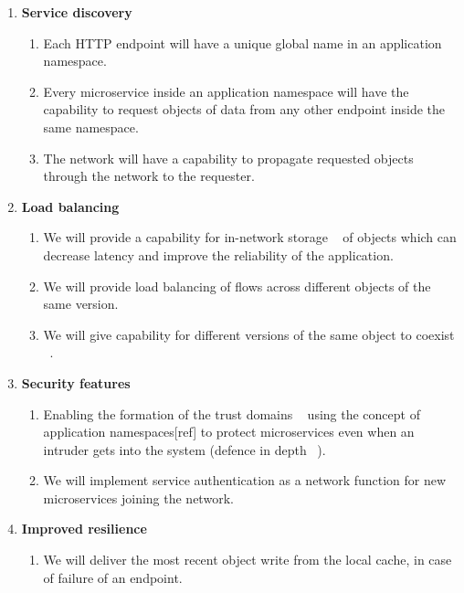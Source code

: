  \begin{enumerate}
 	\item \textbf{Service discovery}
 	 \begin{enumerate}
      	\item Each HTTP endpoint will have a unique global name in an application namespace.
    		\item Every microservice inside an application namespace will have the capability to request objects of data from any other endpoint inside the same namespace.
    		\item The network will have a capability to propagate requested objects through the network to the requester.
	 \end{enumerate}
 
 \item \textbf{Load balancing}
   \begin{enumerate}
    \item We will provide a capability for in-network storage ~\cite{zhang2014named} of objects which can decrease latency and improve the reliability of the application.
    \item We will provide load balancing of flows across different objects of the same version.
    \item We will give capability for different versions of the same object to coexist ~\cite{newman2015building}. 
   \end{enumerate}
   
 \item \textbf{Security features}
  \begin{enumerate}
    \item Enabling the formation of the trust domains ~\cite{dragoni2016microservices} using the concept of application namespaces[ref] to protect microservices even when an intruder gets into the system (defence in depth ~\cite{stouffer2009recommended}).
    \item We will implement service authentication as a network function for new microservices joining the network.
  \end{enumerate}
  
 \item \textbf{Improved resilience}
   \begin{enumerate}
   \item We will deliver the most recent object write from the local cache, in case of failure of an endpoint.
   \end{enumerate} 
 \end{enumerate}
 
